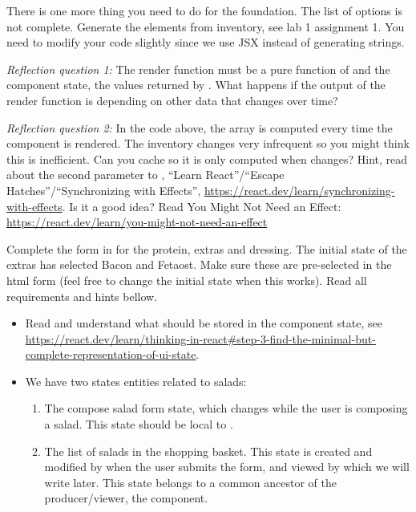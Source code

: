 \documentclass[fleqn, article, a4paper]{memoir}
\begin{document}
\begin{Assignments}
There is one more thing you need to do for the foundation. The list of options is not complete. Generate the  elements from inventory, see lab 1 assignment 1. You need to modify your code slightly since we use JSX instead of generating strings.

\emph{Reflection question 1:} The render function must be a pure function of  and the component state, the values returned by . What happens if the output of the render function is depending on other data that changes over time?

\emph{Reflection question 2:} In the code above, the  array is computed every time the component is rendered. The inventory changes very infrequent so you might think this is inefficient. Can you cache  so it is only computed when  changes? Hint, read about the second parameter to , ``Learn React''/``Escape Hatches''/``Synchronizing with Effects'', \url{https://react.dev/learn/synchronizing-with-effects}. Is it a good idea? Read You Might Not Need an Effect: \url{https://react.dev/learn/you-might-not-need-an-effect}

\item Complete the form in  for the protein, extras and dressing. The initial state of the extras has selected Bacon and Fetaost. Make sure these are pre-selected in the html form (feel free to change the initial state when this works). Read all requirements and hints bellow.
\begin{itemize}
  \item Read and understand what should be stored in the component state, see \\\url{https://react.dev/learn/thinking-in-react#step-3-find-the-minimal-but-complete-representation-of-ui-state}.

  \item We have two states entities related to salads:
  \begin{enumerate}
    \item The compose salad form state, which changes while the user is composing a salad. This state should be local to . 
    \item The list of salads in the shopping basket. This state is created and modified by  when the user submits the form, and viewed by  which we will write later. This state belongs to a common ancestor of the producer/viewer, the  component.
  \end{enumerate}
  

\end{itemize}
\end{Assignments}
\end{document}
